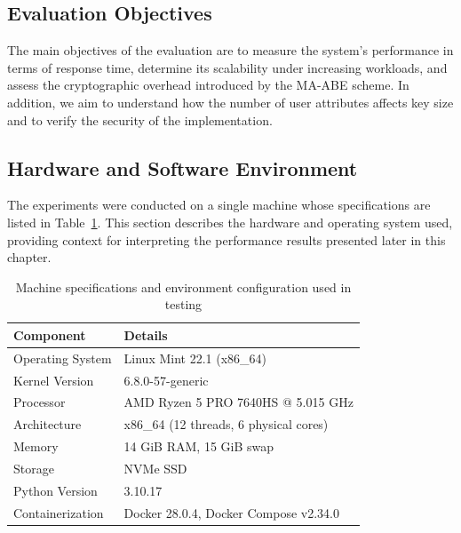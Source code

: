 \documentclass[cic,tc,english]{iiufrgs}
\begin{document}
        \subsection{Evaluation Objectives}
        \label{subsec:evaluation-objectives}
            The main objectives of the evaluation are to measure the system's performance in terms of response time, determine its scalability under increasing workloads, and assess the cryptographic overhead introduced by the MA-ABE scheme. In addition, we aim to understand how the number of user attributes affects key size and to verify the security of the implementation.

        \subsection{Hardware and Software Environment}
        \label{subsec:hardware-software}
            The experiments were conducted on a single machine whose specifications are listed in Table~\ref{tab:machine_specs}. This section describes the hardware and operating system used, providing context for interpreting the performance results presented later in this chapter.


            \begin{table}[h]
                \centering
                \begin{tabular}{|l|l|}
                \hline
                \textbf{Component} & \textbf{Details} \\ \hline
                Operating System & Linux Mint 22.1 (x86\_64) \\ \hline
                Kernel Version & 6.8.0-57-generic \\ \hline
                Processor & AMD Ryzen 5 PRO 7640HS @ 5.015 GHz \\ \hline
                Architecture & x86\_64 (12 threads, 6 physical cores) \\ \hline
                Memory & 14 GiB RAM, 15 GiB swap \\ \hline
                Storage & NVMe SSD \\ \hline
                Python Version & 3.10.17 \\ \hline
                Containerization & Docker 28.0.4, Docker Compose v2.34.0 \\ \hline
                \end{tabular}
                \caption{Machine specifications and environment configuration used in testing}
                \label{tab:machine_specs}
            \end{table}
                
\end{document}
